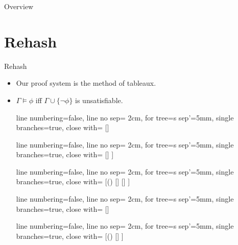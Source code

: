 \setcounter{framenumber}{200}
\begin{frame}
	\maketitle
\end{frame}

\begin{frame}{Overview}
\tableofcontents
\end{frame}

\section{Rehash}
\begin{frame}{Rehash}
	
\begin{itemize}

	\item Our proof system is the method of tableaux.

	\item $\Gamma\vDash\phi$ iff $\Gamma\cup\{\neg\phi\}$ is unsatisfiable.
	
	{\tiny\begin{center}
					
					\begin{prooftree}
					{
					line numbering=false,
					line no sep= 2cm,
					for tree={s sep'=5mm},
					single branches=true,
					close with=\xmark
					}
					[\neg\neg \phi [\phi ] ]
					\end{prooftree}
					\begin{prooftree}
					{
					line numbering=false,
					line no sep= 2cm,
					for tree={s sep'=5mm},
					single branches=true,
					close with=\xmark
					}
					[\phi\land\psi [\phi [\psi ] ] ]
					\end{prooftree}
					\begin{prooftree}
					{
					line numbering=false,
					line no sep= 2cm,
					for tree={s sep'=5mm},
					single branches=true,
					close with=\xmark
					}
					[\neg (\phi\land\psi) [\neg \phi ] [\neg \psi ] ]
					\end{prooftree}
					\begin{prooftree}
					{
					line numbering=false,
					line no sep= 2cm,
					for tree={s sep'=5mm},
					single branches=true,
					close with=\xmark
					}
					[\phi\lor\psi [\phi ] [\psi ] ]
					\end{prooftree}
					\begin{prooftree}
					{
					line numbering=false,
					line no sep= 2cm,
					for tree={s sep'=5mm},
					single branches=true,
					close with=\xmark
					}
					[\neg(\phi\lor\psi) [\neg\phi [\neg\psi ] ] ]
					\end{prooftree}


\end{center}}
\end{itemize}
\end{frame}
